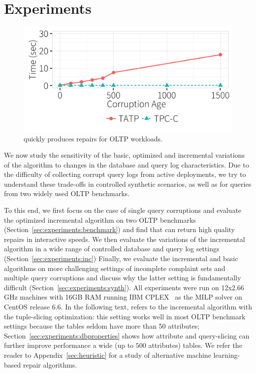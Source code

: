 \section{Experiments}
\label{sec:experiments}

\begin{figure}[t]
\centering
  \includegraphics[width = .75\columnwidth]{figures/benchmark_time}
  \vspace*{-.2in}
  \caption{\sys quickly produces repairs for OLTP workloads.}
  \label{f:tpcctatp} 
  \vspace{-2mm}
\end{figure}


We now study the sensitivity of the basic, optimized and incremental variations of the \sys algorithm 
to changes in the database and query log characteristics.
Due to the difficulty of collecting corrupt query logs from active deployments, 
we try to understand these trade-offs in controlled synthetic scenarios, as well as for queries from two widely used OLTP benchmarks.

To this end, we first focus on the case of single query corruptions and evaluate
the optimized \sys incremental algorithm on two OLTP benchmarks (Section~\ref{sec:experiments:benchmark}) and find that \sys can return high quality repairs in interactive speeds.
We then evaluate the variations of the incremental algorithm in a wide range of controlled database and query log settings (Section~\ref{sec:experiments:inc})
Finally, we evaluate the incremental and basic algorithms on more challenging settings of incomplete complaint sets and multiple query corruptions and discuss why the latter setting is fundamentally difficult (Section~\ref{sec:experiments:synth}).
All experiments were run on 12x2.66 GHz  machines with 16GB RAM running IBM CPLEX~\cite{cplex2014v12} as the MILP solver on CentOS release 6.6.
In the following text, \sys refers to the incremental algorithm with the tuple-slicing optimization: this setting works well in most OLTP benchmark settings because the tables
seldom have more than 50 attributes; Section~\ref{sec:experiments:dbproperties} shows how attribute and query-slicing can further improve performance a wide (up to $500$ attributes) tables.
We refer the reader to Appendix~\ref{sec:heuristic} for a study of alternative machine learning-based repair algorithms.


